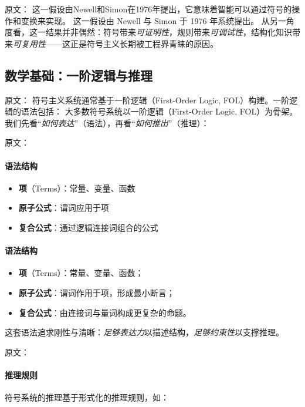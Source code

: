 原文：
这一假设由Newell和Simon在1976年提出，它意味着智能可以通过符号的操作和变换来实现。
这一假设由 Newell 与 Simon 于 1976 年系统提出。  
从另一角度看，这一结果并非偶然：符号带来\emph{可证明性}，规则带来\emph{可调试性}，结构化知识带来\emph{可复用性}——这正是符号主义长期被工程界青睐的原因。


\subsection{数学基础：一阶逻辑与推理}

原文：
符号主义系统通常基于一阶逻辑（First-Order Logic, FOL）构建。一阶逻辑的语法包括：
大多数符号系统以一阶逻辑（First-Order Logic, FOL）为骨架。  
我们先看“\emph{如何表达}”（语法），再看“\emph{如何推出}”（推理）：

原文：
\paragraph{语法结构}
\begin{itemize}
\item \textbf{项}（Terms）：常量、变量、函数
\item \textbf{原子公式}：谓词应用于项
\item \textbf{复合公式}：通过逻辑连接词组合的公式
\end{itemize}
\paragraph{语法结构}
\begin{itemize}
\item \textbf{项}（Terms）：常量、变量、函数；
\item \textbf{原子公式}：谓词作用于项，形成最小断言；
\item \textbf{复合公式}：由连接词与量词构成更复杂的命题。
\end{itemize}
这套语法追求刚性与清晰：\emph{足够表达力}以描述结构，\emph{足够约束性}以支撑推理。

原文：
\paragraph{推理规则}
符号系统的推理基于形式化的推理规则，如：
